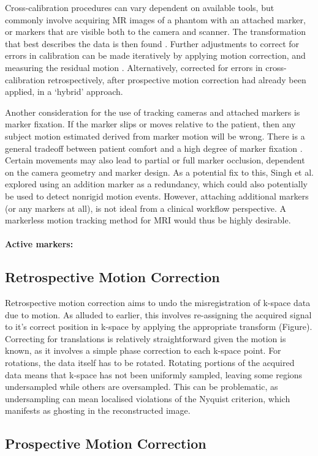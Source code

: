 \documentclass[class=article, crop=false]{standalone}
\begin{document}
\par 
Cross-calibration procedures can vary dependent on available tools, but commonly involve acquiring MR images of a phantom with an attached marker, or markers that are visible both to the camera and scanner. The transformation that best describes the data is then found \parencite{Zahneisen2014,Aksoy2011,Zaitsev2006a}. Further adjustments to correct for errors in calibration can be made iteratively by applying motion correction, and measuring the residual motion \parencite{Zaitsev2006a,Zahneisen2014}. Alternatively, \cite{Aksoy2012} corrected for errors in cross-calibration retrospectively, after prospective motion correction had already been applied, in a `hybrid' approach.
\par
Another consideration for the use of tracking cameras and attached markers is marker fixation. If the marker slips or moves relative to the patient, then any subject motion estimated derived from marker motion will be wrong. There is a general tradeoff between patient comfort and a high degree of marker fixation \parencite{Maclaren2013}. Certain movements may also lead to partial or full marker occlusion, dependent on the camera geometry and marker design. As a potential fix to this, Singh et al. \parencite*{Singh2015} explored using an addition marker as a redundancy, which could also potentially be used to detect nonrigid motion events. However, attaching additional markers (or any markers at all), is not ideal from a clinical workflow perspective. A markerless motion tracking method for MRI would thus be highly desirable.

\paragraph{Active markers:}

\subsection{Retrospective Motion Correction}
Retrospective motion correction aims to undo the misregistration of k-space data due to motion. As alluded to earlier, this involves re-assigning the acquired signal to it's correct position in k-space by applying the appropriate transform (Figure). Correcting for translations is relatively straightforward given the motion is known, as it involves a simple phase correction to each k-space point. For rotations, the data itself has to be rotated. Rotating portions of the acquired data means that k-space has not been uniformly sampled, leaving some regions undersampled while others are oversampled. This can be problematic, as undersampling can mean localised violations of the Nyquist criterion, which manifests as ghosting in the reconstructed image.  


\subsection{Prospective Motion Correction}
\end{document}
